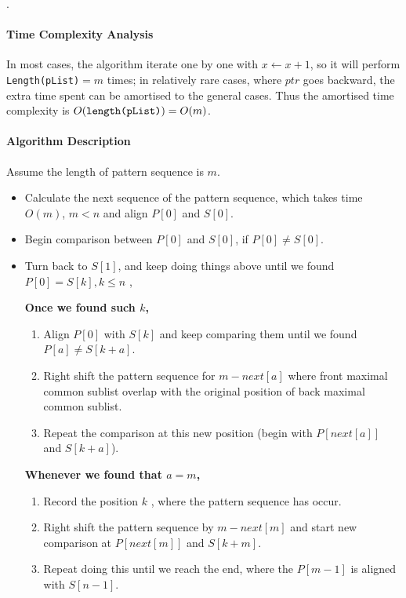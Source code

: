 \begin{questions}
\begin{algorithm}
{{                \Call \Next.\Append{\Now}

            }

        }
    \end{algorithm}

    \paragraph{Time Complexity Analysis}
    In most cases, the algorithm iterate one by one with $x\gets x + 1$, so it will perform \texttt{Length(pList)$=m$} times; in relatively rare cases, where $ptr$ goes backward, the extra time spent can be amortised to the general cases. Thus the amortised time complexity is $O(\mbox{\texttt{length(pList)}}) = O(m)$.

    \paragraph{Algorithm Description}Assume the length of pattern sequence is $m$.
    \begin{itemize}
        \item Calculate the next sequence of the pattern sequence, which takes time $O(m)$, $m<n$ and align $P[0]$ and $S[0]$.
        \item Begin comparison between $P[0]$ and $S[0]$, if $P[0]\neq S[0]$.
        \item Turn back to $S[1]$, and keep doing things above until we found $P[0]=S[k], k\leq n$ ,

              \textbf{Once we found such $k$,}
              \begin{enumerate}
                  \item Align $P[0] $ with $S[k]$ and keep comparing them until we found $P[a]\neq S[k+a]$.
                  \item Right shift the pattern sequence for $m-next[a]$ where front maximal common sublist overlap with the original position of back maximal common sublist.
                  \item Repeat the comparison at this new position (begin with $P[next[a]]$ and $S[k+a]$).
              \end{enumerate}

              \textbf{Whenever we found that $a = m$,}
              \begin{enumerate}
                  \item Record the position $k$ , where the pattern sequence has occur.
                  \item Right shift the pattern sequence by $m-next[m]$ and start new comparison at $P[next[m]]$ and $S[k+m]$.
                  \item Repeat doing this until we reach the end, where the $P[m-1]$ is aligned with $S[n-1]$.
              \end{enumerate}
    \end{itemize}


\end{questions}
